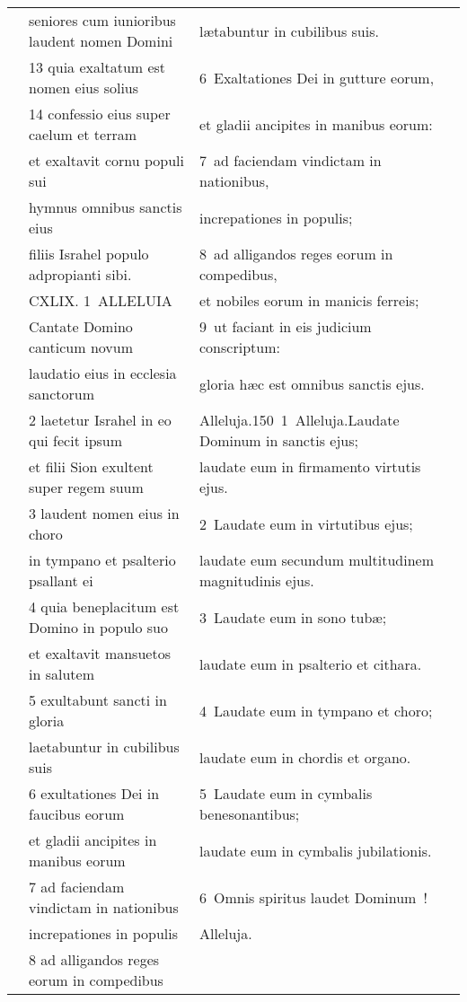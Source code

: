 \documentclass{article}
\begin{document}
\begin{longtable}{@{}p{}p{}p{}@{}}
	&	seniores cum iunioribus laudent nomen Domini	&	lætabuntur in cubilibus suis.	\\
	&	13 quia exaltatum est nomen eius solius	&	6 Exaltationes Dei in gutture eorum,	\\
	&	14 confessio eius super caelum et terram	&	et gladii ancipites in manibus eorum:	\\
	&	et exaltavit cornu populi sui	&	7 ad faciendam vindictam in nationibus,	\\
	&	hymnus omnibus sanctis eius	&	increpationes in populis;	\\
	&	filiis Israhel populo adpropianti sibi.	&	8 ad alligandos reges eorum in compedibus,	\\
	&	CXLIX. 1 ALLELUIA	&	et nobiles eorum in manicis ferreis;	\\
	&	Cantate Domino canticum novum	&	9 ut faciant in eis judicium conscriptum:	\\
	&	laudatio eius in ecclesia sanctorum	&	gloria hæc est omnibus sanctis ejus.	\\
	&	2 laetetur Israhel in eo qui fecit ipsum	&	Alleluja.150 1 Alleluja.Laudate Dominum in sanctis ejus;	\\
	&	et filii Sion exultent super regem suum	&	laudate eum in firmamento virtutis ejus.	\\
	&	3 laudent nomen eius in choro	&	2 Laudate eum in virtutibus ejus;	\\
	&	in tympano et psalterio psallant ei	&	laudate eum secundum multitudinem magnitudinis ejus.	\\
	&	4 quia beneplacitum est Domino in populo suo	&	3 Laudate eum in sono tubæ;	\\
	&	et exaltavit mansuetos in salutem	&	laudate eum in psalterio et cithara.	\\
	&	5 exultabunt sancti in gloria	&	4 Laudate eum in tympano et choro;	\\
	&	laetabuntur in cubilibus suis	&	laudate eum in chordis et organo.	\\
	&	6 exultationes Dei in faucibus eorum	&	5 Laudate eum in cymbalis benesonantibus;	\\
	&	et gladii ancipites in manibus eorum	&	laudate eum in cymbalis jubilationis.	\\
	&	7 ad faciendam vindictam in nationibus	&	6 Omnis spiritus laudet Dominum !	\\
	&	increpationes in populis	&	Alleluja.	\\
	&	8 ad alligandos reges eorum in compedibus	&		\\

\end{longtable}
\end{document}
